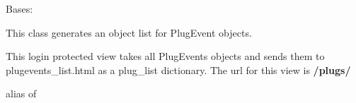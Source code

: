 \documentclass[letterpaper,10pt,english]{sphinxmanual}
\begin{document}
\begin{fulllineitems}
\label{api:mousedb.timed_mating.views.PlugEventsList}
Bases: {\hyperref[api:mousedb.views.ProtectedListView]{}}

This class generates an object list for PlugEvent objects.

This login protected view takes all PlugEvents objects and sends them to plugevents\_list.html as a plug\_list dictionary.
The url for this view is \textbf{/plugs/}

\begin{fulllineitems}
\label{api:mousedb.timed_mating.views.PlugEventsList.context_object_name}
\end{fulllineitems}


\begin{fulllineitems}
\label{api:mousedb.timed_mating.views.PlugEventsList.model}
alias of 

\end{fulllineitems}


\begin{fulllineitems}
\label{api:mousedb.timed_mating.views.PlugEventsList.template_name}
\end{fulllineitems}


\end{fulllineitems}

\end{document}
